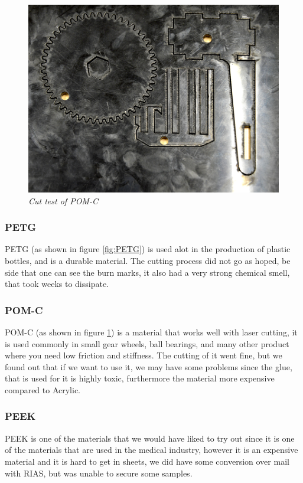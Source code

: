 \begin{figure}[!h]
	\centering
	\includegraphics[scale=1.0]{figures/POM-C.jpg}
	\caption{\small {\it {Cut test of POM-C}}} \label{fig:POM-C}
\end{figure}
\FloatBarrier

\subsubsection{PETG}
PETG (as shown in figure \ref{fig:PETG}) is used alot in the production of plastic bottles, and is a durable material.
The cutting process did not go as hoped, be side that one can see the burn marks, it also had a very strong chemical smell, that took weeks to dissipate.

\subsubsection{POM-C} 
POM-C (as shown in figure \ref{fig:POM-C})  is a material that works well with laser cutting, it is used commonly in small gear wheels, ball bearings, and many other product where you need low friction and stiffness.
The cutting of it went fine, but we found out that if we want to use it, we may have some problems since the glue, that is used for it is highly toxic, furthermore the material more expensive compared to Acrylic.

\subsubsection{PEEK}
PEEK is one of the materials that we would have liked to try out since it is one of the materials that are used in the medical industry, however it is an expensive material and it is hard to get in sheets, we did have some conversion over mail with RIAS, but was unable to secure some samples.

